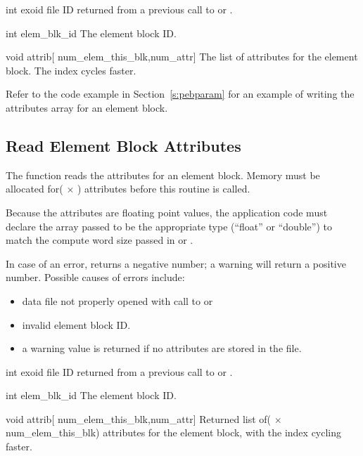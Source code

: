 
\begin{parameters}
\item[{int exoid \R{}}]
\exo{} file ID returned from a previous call to 
or .

\item[{int elem_blk_id \R{}}]
The element block ID.

\item[{void attrib}{[} {num_elem_this_blk,num_attr}{]} {\R{}}]
The list of attributes for the element block. The 
index cycles faster.
\end{parameters}

Refer to the code example in Section~\ref{s:pebparam} for an example
of writing the attributes array for an element block.


\subsection{Read Element Block Attributes}

The function  reads the attributes for an
element block. Memory must be allocated for( $\times$
) attributes before this routine is called.

Because the attributes are floating point values, the application code
must declare the array passed to be the appropriate type (``float'' or
``double'') to match the compute word size passed in
 or .

In case of an error,  returns a
negative number; a warning will return a positive number.
Possible causes of errors include:

\begin{itemize}
 \item data file not properly opened with call to 
 or 

 \item invalid element block ID.

 \item a warning value is returned if no attributes are stored in the
 file.
\end{itemize}



\begin{parameters}
\item[{int exoid \R{}}]
\exo{} file ID returned from a previous call to 
or .

\item[{int elem_blk_id \R{}}]
The element block ID.

\item[{void attrib}{[} {num_elem_this_blk,num_attr}{]} {\W{}}]
Returned list of( $\times$ {num_elem_this_blk}) attributes for
the element block, with the  index cycling faster.
\end{parameters}


